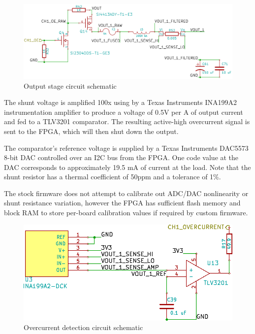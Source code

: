 \documentclass{article}
\begin{document}
\begin{figure}[h!]
\includegraphics[scale=0.25]{output-stage-1.png}
\caption{Output stage circuit schematic}
\label{output-stage-1}
\end{figure}
\FloatBarrier

The shunt voltage is amplified 100x using by a Texas Instruments INA199A2 instrumentation amplifier to produce a 
voltage of 0.5V per A of output current and fed to a TLV3201 comparator. The resulting active-high overcurrent signal 
is sent to the FPGA, which will then shut down the output.

The comparator's reference voltage is supplied by a Texas Instruments DAC5573 8-bit DAC controlled over an I2C bus 
from the FPGA. One code value at the DAC corresponds to approximately 19.5 mA of current at the load. Note that the 
shunt resistor has a thermal coefficient of 50ppm and a tolerance of 1\%.

The stock firmware does not attempt to calibrate out ADC/DAC nonlinearity or shunt resistance variation, however the
FPGA has sufficient flash memory and block RAM to store per-board calibration values if required by custom firmware.

\begin{figure}[h!]
\includegraphics[scale=0.25]{output-stage-2.png}
\caption{Overcurrent detection circuit schematic}
\label{output-stage-2}
\end{figure}
\end{document}
